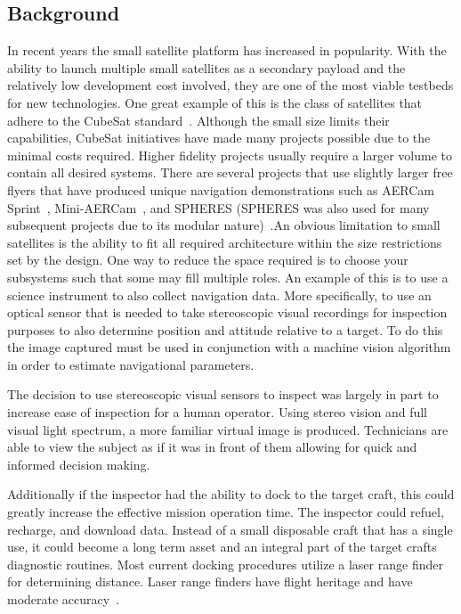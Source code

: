 \documentclass[journal, 10pt]{IEEEtran}
\begin{document}
\subsection{Background}
In recent years the small satellite platform has increased in popularity. With the ability to launch multiple small satellites as a secondary payload and the relatively low development cost involved, they are one of the most viable testbeds for new technologies.  One great example of this is the class of satellites that adhere to the CubeSat standard~\cite{CubeSat}.  Although the small size limits their capabilities, CubeSat initiatives have made many projects possible due to the minimal costs required.  Higher fidelity projects usually require a larger volume to contain all desired systems.  There are several projects that use slightly larger free flyers that have produced unique navigation demonstrations such as AERCam Sprint~\cite{Aercam}, Mini-AERCam~\cite{MiniAercam}, and SPHERES (SPHERES was also used for many subsequent projects due to its modular nature)~\cite{SPHERES}.An obvious limitation to small satellites is the ability to fit all required architecture within the size restrictions set by the design.  One way to reduce the space required is to choose your subsystems such that some may fill multiple roles.  An example of this is to use a science instrument to also collect navigation data.  More specifically, to use an optical sensor that is needed to take stereoscopic visual recordings for inspection purposes to also determine position and attitude relative to a target.  To do this the image captured must be used in conjunction with a machine vision algorithm in order to estimate navigational parameters.

The decision to use stereoscopic visual sensors to inspect was largely in part to increase ease of inspection for a human operator.  Using stereo vision and full visual light spectrum, a more familiar virtual image is produced.  Technicians are able to view the subject as if it was in front of them allowing for quick and informed decision making.

Additionally if the inspector had the ability to dock to the target craft, this could greatly increase the effective mission operation time.  The inspector could refuel, recharge, and download data.  Instead of a small disposable craft that has a single use, it could become a long term asset and an integral part of the target crafts diagnostic routines.  Most current docking procedures utilize a laser range finder for determining distance.  Laser range finders have flight heritage and have moderate accuracy~\cite{Docking}.
\end{document}
